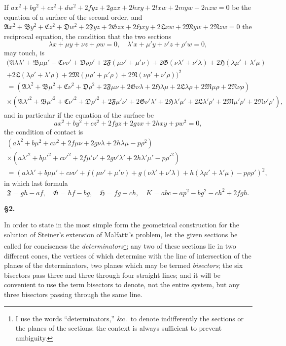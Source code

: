 \documentclass[11pt]{article}
\begin{document}
If $ax^2+by^2+cz^2+dw^2+2fyz+2gzx+2hxy+2lxw+2myw+2nzw=0$ be the equation of a surface of the second order, and $\mathfrak{A}x^2+\mathfrak{B}y^2+\mathfrak{C}z^2+\mathfrak{D}w^2+2\mathfrak{F}yz+2\mathfrak{G}zx+2\mathfrak{H}xy+2\mathfrak{L}xw+2\mathfrak{M}yw+2\mathfrak{N}zw=0$ the reciprocal equation, the condition that the two sections
\[
\lambda x + \mu y + \nu z + \rho w = 0, \quad \lambda' x + \mu' y + \nu' z + \rho' w = 0,
\]
may touch, is
\begin{multline*}
(\mathfrak{A}\lambda\lambda' + \mathfrak{B}\mu\mu' + \mathfrak{C}\nu\nu' + \mathfrak{D}\rho\rho' + 2\mathfrak{F}(\mu\nu'+\mu'\nu) + 2\mathfrak{G}(\nu\lambda'+\nu'\lambda) + 2\mathfrak{H}(\lambda\mu'+\lambda'\mu) \\
+ 2\mathfrak{L}(\lambda\rho'+\lambda'\rho) + 2\mathfrak{M}(\mu\rho'+\mu'\rho) + 2\mathfrak{N}(\nu\rho'+\nu'\rho))^2 \\
= (\mathfrak{A}\lambda^2 + \mathfrak{B}\mu^2 + \mathfrak{C}\nu^2 + \mathfrak{D}\rho^2 + 2\mathfrak{F}\mu\nu + 2\mathfrak{G}\nu\lambda + 2\mathfrak{H}\lambda\mu + 2\mathfrak{L}\lambda\rho + 2\mathfrak{M}\mu\rho + 2\mathfrak{N}\nu\rho) \\
\times (\mathfrak{A}\lambda'^2 + \mathfrak{B}\mu'^2 + \mathfrak{C}\nu'^2 + \mathfrak{D}\rho'^2 + 2\mathfrak{F}\mu'\nu' + 2\mathfrak{G}\nu'\lambda' + 2\mathfrak{H}\lambda'\mu' + 2\mathfrak{L}\lambda'\rho' + 2\mathfrak{M}\mu'\rho' + 2\mathfrak{N}\nu'\rho'),
\end{multline*}
and in particular if the equation of the surface be
\[
ax^2 + by^2 + cz^2 + 2fyz + 2gzx + 2hxy + pw^2 = 0,
\]
the condition of contact is
\begin{multline*}
(a\lambda^2 + b\mu^2 + c\nu^2 + 2f\mu\nu + 2g\nu\lambda + 2h\lambda\mu - p\rho^2) \\
\times (a\lambda'^2 + b\mu'^2 + c\nu'^2 + 2f\mu'\nu' + 2g\nu'\lambda' + 2h\lambda'\mu' - p\rho'^2) \\
= (a\lambda\lambda' + b\mu\mu' + c\nu\nu' + f(\mu\nu'+\mu'\nu) + g(\nu\lambda'+\nu'\lambda) + h(\lambda\mu'+\lambda'\mu) - p\rho\rho')^2,
\end{multline*}
in which last formula
\[
\mathfrak{F} = gh-af, \quad \mathfrak{G} = hf-bg, \quad \mathfrak{H} = fg-ch, \quad K = abc-ap^2-bg^2-ch^2+2fgh.
\]

\newpage
\setcounter{page}{59}

\noindent\textbf{\S 2.}

In order to state in the most simple form the geometrical construction for the solution of Steiner's extension of Malfatti's problem, let the given sections be called for conciseness the \textit{determinators}\footnote{I use the words ``determinators,'' \&c.\ to denote indifferently the sections or the planes of the sections: the context is always sufficient to prevent ambiguity.}; any two of these sections lie in two different cones, the vertices of which determine with the line of intersection of the planes of the determinators, two planes which may be termed \textit{bisectors}; the six bisectors pass three and three through four straight lines; and it will be convenient to use the term bisectors to denote, not the entire system, but any three bisectors passing through the same line.
\end{document}
